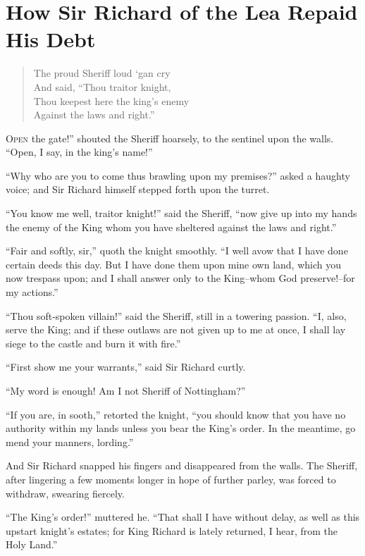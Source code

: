 \chapter{How Sir Richard of the Lea Repaid His Debt}

\begin{quote}
The proud Sheriff loud ‘gan cry\\
And said, “Thou traitor knight,\\
Thou keepest here the king’s enemy\\
Against the laws and right.”
\end{quote}

\lettrine{O}{pen} the gate!'' shouted the Sheriff hoarsely, to the sentinel upon
the walls. ``Open, I say, in the king's name!''

``Why who are you to come thus brawling upon my premises?'' asked a
haughty voice; and Sir Richard himself stepped forth upon the turret.

``You know me well, traitor knight!'' said the Sheriff, ``now give up
into my hands the enemy of the King whom you have sheltered against the
laws and right.''

``Fair and softly, sir,'' quoth the knight smoothly. ``I well avow that
I have done certain deeds this day. But I have done them upon mine own
land, which you now trespass upon; and I shall answer only to the
King--whom God preserve!--for my actions.''

``Thou soft-spoken villain!'' said the Sheriff, still in a towering
passion. ``I, also, serve the King; and if these outlaws are not given
up to me at once, I shall lay siege to the castle and burn it with
fire.''

``First show me your warrants,'' said Sir Richard curtly.

``My word is enough! Am I not Sheriff of Nottingham?''

``If you are, in sooth,'' retorted the knight, ``you should know that
you have no authority within my lands unless you bear the King's order.
In the meantime, go mend your manners, lording.''

And Sir Richard snapped his fingers and disappeared from the walls. The
Sheriff, after lingering a few moments longer in hope of further parley,
was forced to withdraw, swearing fiercely.

``The King's order!'' muttered he. ``That shall I have without delay, as
well as this upstart knight's estates; for King Richard is lately
returned, I hear, from the Holy Land.''

